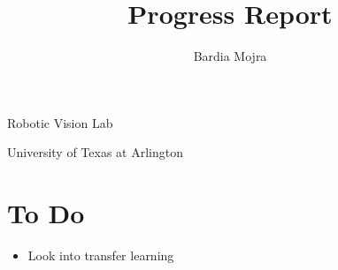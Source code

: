 \documentclass[11pt]{article}
\title{Progress Report}
\author{Bardia Mojra}
\begin{document}
\maketitle
\thispagestyle{empty}

\begin{center}
	\bigskip
	\bigskip
	Robotic Vision Lab

	University of Texas at Arlington
\end{center}

\newpage

\section{To Do}
\begin{itemize}
	\item Look into transfer learning
\end{itemize}
\end{document}
